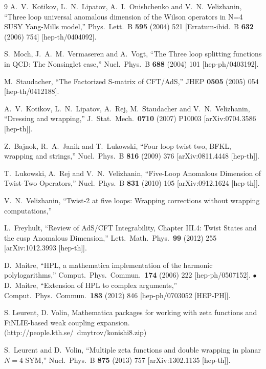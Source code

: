 \documentclass[a4paper,11pt]{article}
\numberwithin{equation}{section}
\begin{document}
\begin{thebibliography} {9}
  A.~V.~Kotikov, L.~N.~Lipatov, A.~I.~Onishchenko and V.~N.~Velizhanin,
  ``Three loop universal anomalous dimension of the Wilson operators in N=4 SUSY Yang-Mills model,''
  Phys.\ Lett.\ B {\bf 595} (2004) 521
   [Erratum-ibid.\ B {\bf 632} (2006) 754]
  [hep-th/0404092].

  S.~Moch, J.~A.~M.~Vermaseren and A.~Vogt,
  ``The Three loop splitting functions in QCD: The Nonsinglet case,''
  Nucl.\ Phys.\ B {\bf 688} (2004) 101
  [hep-ph/0403192].

  M.~Staudacher,
  ``The Factorized S-matrix of CFT/AdS,''
  JHEP {\bf 0505} (2005) 054
  [hep-th/0412188].

  A.~V.~Kotikov, L.~N.~Lipatov, A.~Rej, M.~Staudacher and V.~N.~Velizhanin,
  ``Dressing and wrapping,''
  J.\ Stat.\ Mech.\  {\bf 0710} (2007) P10003
  [arXiv:0704.3586 [hep-th]].

  Z.~Bajnok, R.~A.~Janik and T.~Lukowski,
  ``Four loop twist two, BFKL, wrapping and strings,''
  Nucl.\ Phys.\ B {\bf 816} (2009) 376
  [arXiv:0811.4448 [hep-th]].

  T.~Lukowski, A.~Rej and V.~N.~Velizhanin,
  ``Five-Loop Anomalous Dimension of Twist-Two Operators,''
  Nucl.\ Phys.\ B {\bf 831} (2010) 105
  [arXiv:0912.1624 [hep-th]].

  V.~N.~Velizhanin,
  ``Twist-2 at five loops: Wrapping corrections without wrapping computations,''

  L.~Freyhult,
  ``Review of AdS/CFT Integrability, Chapter III.4: Twist States and the cusp Anomalous Dimension,''
  Lett.\ Math.\ Phys.\  {\bf 99} (2012) 255
  [arXiv:1012.3993 [hep-th]].

D.~Maitre,
  ``HPL, a mathematica implementation of the harmonic polylogarithms,''
  Comput.\ Phys.\ Commun.\  {\bf 174} (2006) 222
  [hep-ph/0507152]. $\bullet$
  D.~Maitre,
  ``Extension of HPL to complex arguments,''
  Comput.\ Phys.\ Commun.\  {\bf 183} (2012) 846
  [hep-ph/0703052 [HEP-PH]].

S. Leurent, D. Volin, Mathematica packages for working with zeta
functions and FiNLIE-based weak coupling expansion.
(http://people.kth.se/~dmytrov/konishi8.zip)

  S.~Leurent and D.~Volin,
  ``Multiple zeta functions and double wrapping in planar $N=4$ SYM,''
  Nucl.\ Phys.\ B {\bf 875} (2013) 757
  [arXiv:1302.1135 [hep-th]].


\end{thebibliography}
\end{document}

